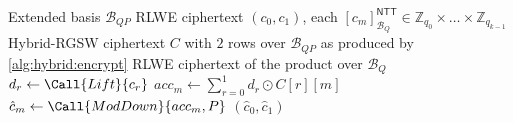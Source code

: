 \begin{algorithm}
\caption{RLWE $\boxdot$ Hybrid-RGSW}
\label{alg:hybrid:extprod}
\begin{algorithmic}[1]
\Require Extended basis $\mathcal{B}_{QP}$
\Require RLWE ciphertext $(c_0, c_1)$, each $[c_m]^{\mathsf{NTT}}_{\mathcal{B}_Q} \in \mathbb{Z}_{q_0} \times \dots \times  \mathbb{Z}_{q_{k-1}}$
\Require Hybrid-RGSW ciphertext $C$ with $2$ rows over $\mathcal{B}_{QP}$ as produced by \autoref{alg:hybrid:encrypt}
\Ensure RLWE ciphertext of the product over $\mathcal{B}_Q$
\For{$r \gets [0, 2)$ \textbf{in parallel}}
    \State $d_r \gets \Call{Lift}{c_r}$
\EndFor
\For{$m \gets [0, 2)$ \textbf{in parallel}}
    \State $acc_m \gets \sum_{r = 0}^{1} d_r \odot C[r][m]$
    \State $\hat{c}_m \gets \Call{ModDown}{acc_m, P}$
\EndFor
\State \Return $(\hat{c}_0, \hat{c}_1)$
\end{algorithmic}
\end{algorithm}

